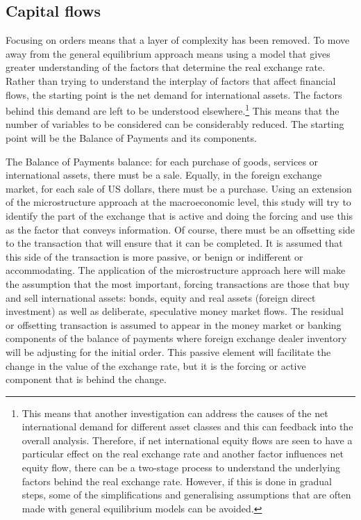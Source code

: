 \documentclass[12pt, a4paper, oneside]{article}\usepackage[]{graphicx}\usepackage[]{color}
\begin{document}
\subsection{Capital flows}
Focusing on orders means that a layer of complexity has been removed.  To move away from the general equilibrium approach means using a model that gives greater understanding of the factors that determine the real exchange rate.  Rather than trying to understand the interplay of factors that affect financial flows, the starting point is the net demand for international assets.  The factors behind this demand are left to be understood elsewhere.\footnote{This means that another investigation can address the causes of the net international demand for different asset classes and this can feedback into the overall analysis.  Therefore, if net international equity flows are seen to have a particular effect on the real exchange rate and another factor influences net equity flow, there can be a two-stage process to understand the underlying factors behind the real exchange rate.  However, if this is done in gradual steps, some of the simplifications and generalising assumptions that are often made with general equilibrium models can be avoided.}  This means that the number of variables to be considered can be considerably reduced.  The starting point will be the Balance of Payments and its components. 

The Balance of Payments balance: for each purchase of goods, services or international assets, there must be a sale.  Equally, in the foreign exchange market, for each sale of US dollars, there must be a purchase.  Using an extension of the microstructure approach at the macroeconomic level, this study will try to identify the part of the exchange that is active and doing the forcing and use this as the factor that conveys information.  Of course, there must be an offsetting side to the transaction that will ensure that it can be completed.  It is assumed that this side of the transaction is more passive, or benign or indifferent or accommodating.  The application of the microstructure approach here will make the assumption that the most important, forcing transactions are those that buy and sell international assets: bonds, equity and real assets (foreign direct investment) as well as deliberate, speculative money market flows.  The residual or offsetting transaction is assumed to appear in the money market or banking components of the balance of payments where foreign exchange dealer inventory will be adjusting for the initial order.   This passive element will facilitate the change in the value of the exchange rate, but it is the forcing or active component that is behind the change.  
\end{document}
